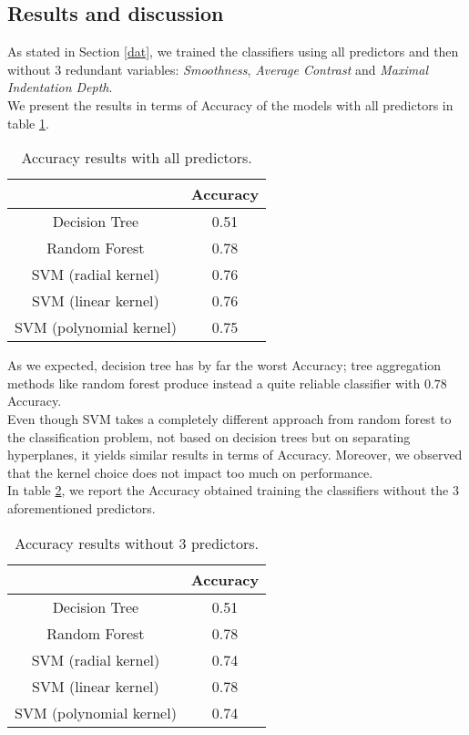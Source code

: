 \documentclass{article}
\begin{document}
\subsection{Results and discussion}
As stated in Section \ref{dat}, we trained the classifiers using all predictors and then without $3$ redundant variables: \textit{Smoothness}, \textit{Average Contrast} and \textit{Maximal} \textit{Indentation Depth}. 
\\We present the results in terms of Accuracy of the models with all predictors in table \ref{table1}. 
\begin{table}[ht]
 \centering
\begin{tabular}{ |c|c|} \hline
 & Accuracy \\
\hline
Decision Tree & 0.51 \\ 
\hline
 Random Forest & 0.78  \\ 
\hline
 SVM (radial kernel) & 0.76 \\ 
\hline
 SVM (linear kernel) & 0.76 \\ 
\hline
 SVM (polynomial kernel) & 0.75 \\ 
\hline
\end{tabular}
\caption{Accuracy results with all predictors.}\label{table1}
\end{table}

As we expected, decision tree has by far the worst Accuracy; tree aggregation methods like random forest produce instead a quite reliable classifier with $0.78$ Accuracy. 
\\Even though SVM takes a completely different approach from random forest to the classification problem, not based on decision trees but on separating hyperplanes, it yields similar results in terms of Accuracy. Moreover, we observed that the kernel choice does not impact too much on performance.
\\In table \ref{table2}, we report the Accuracy obtained training the classifiers without the $3$ aforementioned predictors.
\newpage

\begin{table}[ht]
 \centering
\begin{tabular}{ |c|c|} \hline
 &  Accuracy \\
\hline
Decision Tree & 0.51 \\ 
\hline
 Random Forest & 0.78 \\ 
\hline
 SVM (radial kernel) & 0.74 \\ 
\hline
 SVM (linear kernel) & 0.78  \\ 
\hline
 SVM (polynomial kernel) & 0.74 \\ 
\hline
\end{tabular}
\caption{Accuracy results without $3$ predictors.}\label{table2}
\end{table}
\end{document}
